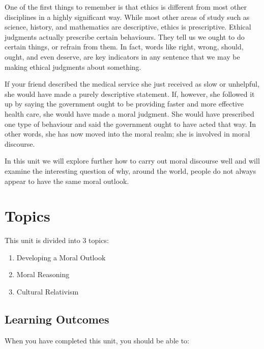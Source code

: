 \documentclass[
]{book}
\providecommand{\tightlist}{%
  \setlength{\itemsep}{0pt}\setlength{\parskip}{0pt}}
\begin{document}
One of the first things to remember is that ethics is different from most other disciplines in a highly significant way. While most other areas of study such as science, history, and mathematics are descriptive, ethics is prescriptive. Ethical judgments actually prescribe certain behaviours. They tell us we ought to do certain things, or refrain from them. In fact, words like right, wrong, should, ought, and even deserve, are key indicators in any sentence that we may be making ethical judgments about something.

If your friend described the medical service she just received as slow or unhelpful, she would have made a purely descriptive statement. If, however, she followed it up by saying the government ought to be providing faster and more effective health care, she would have made a moral judgment. She would have prescribed one type of behaviour and said the government ought to have acted that way. In other words, she has now moved into the moral realm; she is involved in moral discourse.

In this unit we will explore further how to carry out moral discourse well and will examine the interesting question of why, around the world, people do not always appear to have the same moral outlook.

\hypertarget{topics}{%
\section*{Topics}\label{topics}}

This unit is divided into 3 topics:

\begin{enumerate}
\def\labelenumi{\arabic{enumi}.}
\tightlist
\item
  Developing a Moral Outlook\\
\item
  Moral Reasoning\\
\item
  Cultural Relativism
\end{enumerate}

\hypertarget{learning-outcomes}{%
\subsection*{Learning Outcomes}\label{learning-outcomes}}

When you have completed this unit, you should be able to:
\end{document}
